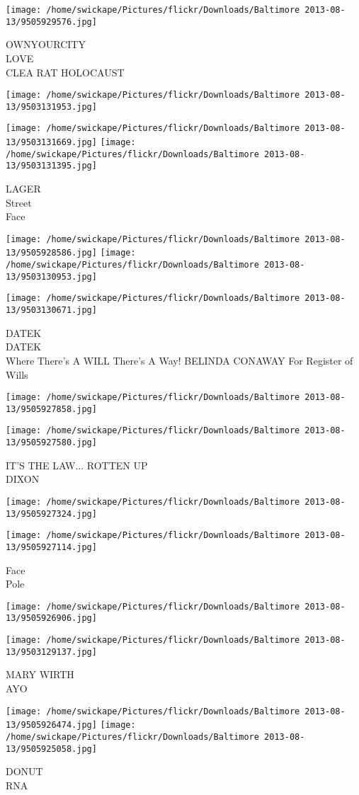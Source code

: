 \documentclass[10pt,letterpaper]{article}
\begin{document}
\texttt{[image: /home/swickape/Pictures/flickr/Downloads/Baltimore 2013-08-13/9505929576.jpg]}

OWNYOURCITY\\
LOVE\\
CLEA RAT HOLOCAUST
\pagebreak

\texttt{[image: /home/swickape/Pictures/flickr/Downloads/Baltimore 2013-08-13/9503131953.jpg]}

\vspace{0.25in}
\texttt{[image: /home/swickape/Pictures/flickr/Downloads/Baltimore 2013-08-13/9503131669.jpg]}
\texttt{[image: /home/swickape/Pictures/flickr/Downloads/Baltimore 2013-08-13/9503131395.jpg]}

LAGER\\
Street\\
Face
\pagebreak

\texttt{[image: /home/swickape/Pictures/flickr/Downloads/Baltimore 2013-08-13/9505928586.jpg]}
\texttt{[image: /home/swickape/Pictures/flickr/Downloads/Baltimore 2013-08-13/9503130953.jpg]}

\texttt{[image: /home/swickape/Pictures/flickr/Downloads/Baltimore 2013-08-13/9503130671.jpg]}

DATEK\\
DATEK\\
Where There's A WILL There's A Way!  BELINDA CONAWAY For Register of Wills
\pagebreak

\texttt{[image: /home/swickape/Pictures/flickr/Downloads/Baltimore 2013-08-13/9505927858.jpg]}

\vspace{0.25in}
\texttt{[image: /home/swickape/Pictures/flickr/Downloads/Baltimore 2013-08-13/9505927580.jpg]}

IT'S THE LAW... ROTTEN UP\\
DIXON
\pagebreak

\texttt{[image: /home/swickape/Pictures/flickr/Downloads/Baltimore 2013-08-13/9505927324.jpg]}

\vspace{0.25in}
\texttt{[image: /home/swickape/Pictures/flickr/Downloads/Baltimore 2013-08-13/9505927114.jpg]}

Face\\
Pole
\pagebreak

\texttt{[image: /home/swickape/Pictures/flickr/Downloads/Baltimore 2013-08-13/9505926906.jpg]}

\vspace{0.25in}
\texttt{[image: /home/swickape/Pictures/flickr/Downloads/Baltimore 2013-08-13/9503129137.jpg]}

MARY WIRTH\\
AYO
\pagebreak

\texttt{[image: /home/swickape/Pictures/flickr/Downloads/Baltimore 2013-08-13/9505926474.jpg]}
\texttt{[image: /home/swickape/Pictures/flickr/Downloads/Baltimore 2013-08-13/9505925058.jpg]}

DONUT\\
RNA
\pagebreak
\end{document}

